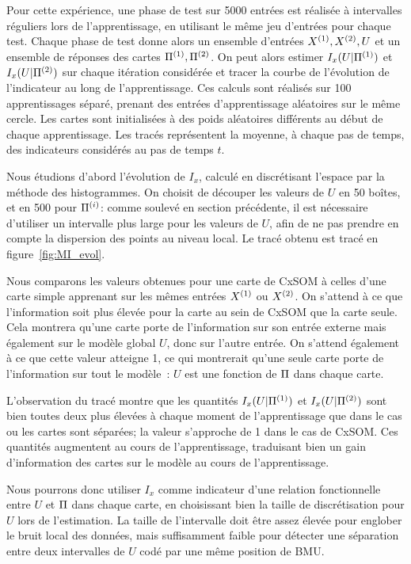 \documentclass[../main]{subfiles}
\begin{document}
Pour cette expérience, une phase de test sur 5000 entrées est réalisée à intervalles réguliers lors de l'apprentissage, en utilisant le même jeu d'entrées pour chaque test. Chaque phase de test donne alors un ensemble d'entrées $X^{({1})}, X^{({2})}, U$ et un ensemble de réponses des cartes $\Pi^{({1})}, \Pi^{({2})}$. On peut alors estimer $I_x(U|\Pi^{({1})})$ et $I_x(U|\Pi^{({2})})$ sur chaque itération considérée et tracer la courbe de l'évolution de l'indicateur au long de l'apprentissage. 
Ces calculs sont réalisés sur 100 apprentissages séparé, prenant des entrées d'apprentissage aléatoires sur le même cercle. Les cartes sont initialisées à des poids aléatoires différents au début de chaque apprentissage. 
Les tracés représentent la moyenne, à chaque pas de temps, des indicateurs considérés au pas de temps $t$.

Nous étudions d'abord l'évolution de $I_x$, calculé en discrétisant l'espace par la méthode des histogrammes.
On choisit de découper les valeurs de $U$ en 50 boîtes, et en 500 pour $\Pi^{({i})}$: comme soulevé en section précédente, il est nécessaire d'utiliser un intervalle plus large pour les valeurs de $U$, afin de ne pas prendre en compte la dispersion des points au niveau local. Le tracé obtenu est tracé en figure~\ref{fig:MI_evol}.

Nous comparons les valeurs obtenues pour une carte de CxSOM à celles d'une carte simple apprenant sur les mêmes entrées $X^{({1})}$ ou $X^{({2})}$.
On s'attend à ce que l'information soit plus élevée pour la carte au sein de CxSOM que la carte seule. Cela montrera qu'une carte porte de l'information sur son entrée externe mais également sur le modèle global $U$, donc sur l'autre entrée.
On s'attend également à ce que cette valeur atteigne 1, ce qui montrerait qu'une seule carte porte de l'information sur tout le modèle~: $U$ est une fonction de $\Pi$ dans chaque carte.

L'observation du tracé montre que les quantités $I_x(U|\Pi^{({1})})$ et $I_x(U|\Pi^{({2})})$ sont bien toutes deux plus élevées à chaque moment de l'apprentissage que dans le cas ou les cartes sont séparées; la valeur s'approche de 1 dans le cas de CxSOM.
Ces quantités augmentent au cours de l'apprentissage, traduisant bien un gain d'information des cartes sur le modèle au cours de l'apprentissage.

Nous pourrons donc utiliser $I_x$ comme indicateur d'une relation fonctionnelle entre $U$ et $\Pi$ dans chaque carte, en choisissant bien la taille de discrétisation pour $U$ lors de l'estimation. La taille de l'intervalle doit être assez élevée pour englober le bruit local des données, mais suffisamment faible pour détecter une séparation entre deux intervalles de $U$ codé par une même position de BMU.
\end{document}

